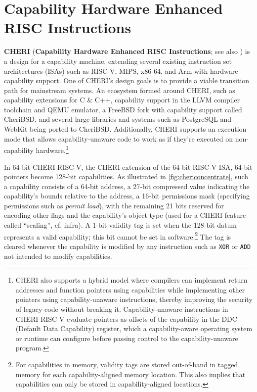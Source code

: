 \documentclass[main.tex]{subfiles}
\begin{document}
\section{Capability Hardware Enhanced RISC Instructions}
\textbf{CHERI} (\textbf{Capability Hardware Enhanced RISC Instructions}; see also \citet{intro2cheri}) is a design for a capability machine, extending several existing instruction set architectures (ISAs) such as RISC-V, MIPS, x86-64, and Arm with hardware capability support. One of CHERI’s design goals is to provide a viable transition path for mainstream systems. An ecosystem formed around CHERI, such as capability extensions for C \& C++, capability support in the LLVM compiler toolchain and QEMU emulator, a FreeBSD fork with capability support called CheriBSD, and several large libraries and systems such as PostgreSQL and WebKit being ported to CheriBSD. Additionally, CHERI supports an execution mode that allows capability-unaware code to work as if they're executed on non-capability hardware.\footnote{CHERI also supports a hybrid model where compilers can implement return addresses and function pointers using capabilities while implementing other pointers using capability-unaware instructions, thereby improving the security of legacy code without breaking it. Capability-unaware instructions in CHERI-RISC-V evaluate pointers as offsets of the capability in the DDC (Default Data Capability) register, which a capability-aware operating system or runtime can configure before passing control to the capability-unaware program.}

In 64-bit CHERI-RISC-V, the CHERI extension of the 64-bit RISC-V ISA, 64-bit pointers become 128-bit capabilities. As illustrated in \cref{fig:chericoncentrate}, such a capability consists of a 64-bit address, a 27-bit compressed value indicating the capability’s bounds relative to the address, a 16-bit permissions mask (specifying permissions such as \emph{permit load}), with the remaining 21 bits reserved for encoding other flags and the capability’s object type (used for a CHERI feature called \enquote{\gls*{sealing}}, cf. infra). A 1-bit validity tag is set when the 128-bit datum represents a valid capability; this bit cannot be set in software.\footnote{For capabilities in memory, validity tags are stored out-of-band in tagged memory for each capability-aligned memory location. This also implies that capabilities can only be stored in capability-aligned locations.} The tag is cleared whenever the capability is modified by any instruction such as \texttt{XOR} or \texttt{ADD} not intended to modify capabilities.
\end{document}
